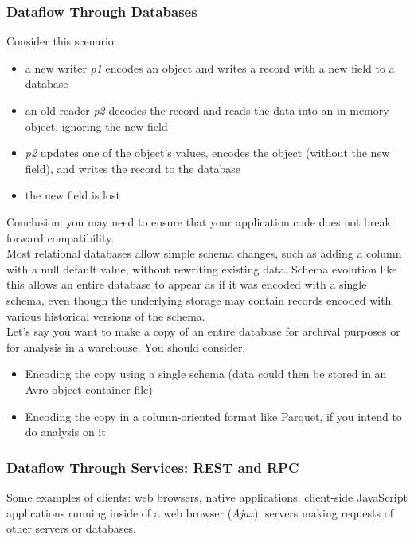 \documentclass[12pt, titlepage]{article}
\begin{document}
\subsubsection{Dataflow Through Databases}

Consider this scenario:
\begin{itemize}
    \item a new writer \textit{p1} encodes an object and writes a record with a new field to a database
    \item an old reader \textit{p2} decodes the record and reads the data into an in-memory object, ignoring the new field
    \item \textit{p2} updates one of the object's values, encodes the object (without the new field), and writes the record to the database
    \item the new field is lost
\end{itemize}
Conclusion: you may need to ensure that your application code does not break forward compatibility. \\

Most relational databases allow simple schema changes, such as adding a column with a null default value, without rewriting existing data. Schema evolution like this allows an entire database to appear as if it was encoded with a single schema, even though the underlying storage may contain records encoded with various historical versions of the schema. \\

Let's say you want to make a copy of an entire database for archival purposes or for analysis in a warehouse. You should consider:
\begin{itemize}
    \item Encoding the copy using a single schema (data could then be stored in an Avro object container file)
    \item Encoding the copy in a column-oriented format like Parquet, if you intend to do analysis on it
\end{itemize}

\subsubsection{Dataflow Through Services: REST and RPC}

Some examples of clients: web browsers, native applications, client-side JavaScript applications running inside of a web browser (\textit{Ajax}), servers making requests of other servers or databases. \\
\end{document}
